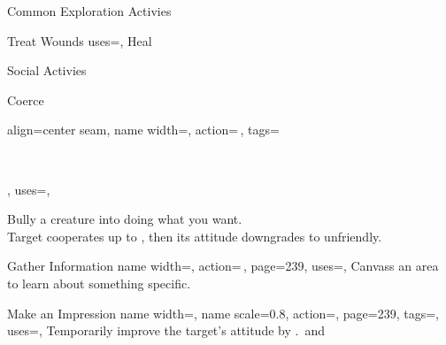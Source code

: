 \begin{PageFront}
\begin{Tables}{\frontTableHeight}
\begin{Table}{Common Exploration Activies}
\begin{entry}{Treat Wounds}
{                uses=\Medicine,
            }
                Heal  \hfill {} \hfill{}\\\hfill
                \Ts\DC[15] \quad
                \E\DC[20] \quad
                \M\DC[30]  \quad
                \Le\DC[40] \hfill {}
            \end{entry}
        \end{Table}
        \TableSpace
        \begin{Table}{Social Activies}
            \begin{entry}{Coerce}{%
                align=center seam,
                name width=\activityLength,%
                action=\,,
                tags=\parbox{0.5\linewidth}{\raggedleft{}\,\Concentrate\\\Auditory\Linguistic},
                uses=\InitimidationWill,
            }
                Bully a creature into doing what you want.\\
                Target cooperates up to , then its attitude downgrades to unfriendly. \hfill{}\\
                \hfill {}
            \end{entry}
            \begin{entry}{Gather Information}{%
                name width=\activityLength,%
                action=\,,
                page=239,
                uses={\Diplomacy[tags={S}]},
            }
                Canvass an area to learn about something specific.\hfill{}
            \end{entry}
            \begin{entry}{Make an Impression}{%
                name width=\activityLength,%
                name scale=0.8,
                action=,
                page=239,
                tags=\kern-0.5pt\Mental\Concentrate,
                uses=\DiplomacyWill,
            }
                Temporarily improve the target's attitude by . \quad\Auditory\,and
                \Linguistic

\end{entry}
\end{Table}
\end{Tables}
\end{PageFront}
